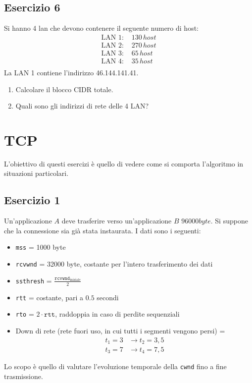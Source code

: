 \documentclass[a4paper]{article}
\begin{document}
\subsection{Esercizio 6}
Si hanno 4 lan che devono contenere il seguente numero di host:
\[
\begin{aligned}
  \text{LAN 1: } & 130 \, host\\
  \text{LAN 2: } & 270 \, host\\
  \text{LAN 3: } & 65 \, host\\
  \text{LAN 4: } & 35 \, host\\
\end{aligned}
\] 
La LAN 1 contiene l'indirizzo 46.144.141.41.
\begin{enumerate}
  \item Calcolare il blocco CIDR totale.
  \item Quali sono gli indirizzi di rete delle 4 LAN?
\end{enumerate}

\section{TCP}
L'obiettivo di questi esercizi è quello di vedere come si comporta l'algoritmo in situazioni 
particolari.
\subsection{Esercizio 1}
Un'applicazione \( A \) deve trasferire verso un'applicazione \( B \) \( 96000 byte \).
Si suppone che la connessione sia già stata instaurata. I dati sono i seguenti:
\begin{itemize}
  \item \texttt{mss} = 1000 byte
  \item \texttt{rcvwnd} = 32000 byte, costante per l'intero trasferimento dei dati
  \item \texttt{ssthresh} = \( \frac{\texttt{rcvwnd}_{\text{iniziale}}}{2} \) 
  \item \texttt{rtt} = costante, pari a \( 0.5 \) secondi
  \item \texttt{rto} = \( 2 \cdot \texttt{rtt} \), raddoppia in caso di perdite sequenziali
  \item Down di rete (rete fuori uso, in cui tutti i segmenti vengono persi) = 
    \[
    \begin{aligned}
      t_1 = 3 &\to t_2 = 3,5\\
      t_3 = 7 &\to t_4 = 7,5
    \end{aligned}
    \] 
\end{itemize}
Lo scopo è quello di valutare l'evoluzione temporale della \texttt{cwnd} fino a fine
trasmissione.
\end{document}

